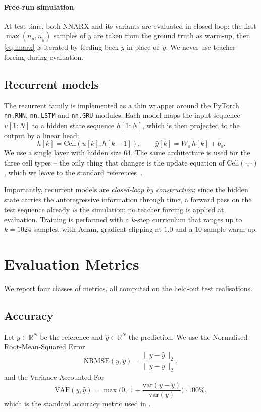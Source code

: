 \documentclass[conference]{IEEEtran}
\begin{document}
\paragraph{Free-run simulation}
At test time, both NNARX and its variants are evaluated in closed loop:
the first $\max(n_u,n_y)$ samples of $y$ are taken from the ground
truth as warm-up, then \eqref{eq:nnarx} is iterated by feeding back
$\hat{y}$ in place of~$y$. We never use teacher forcing during
evaluation.

\subsection{Recurrent models}
The recurrent family is implemented as a thin wrapper around the
PyTorch \texttt{nn.RNN}, \texttt{nn.LSTM} and \texttt{nn.GRU} modules.
Each model maps the input sequence $u[1{:}N]$ to a hidden state sequence
$h[1{:}N]$, which is then projected to the output by a linear head:
\begin{equation}
    h[k] = \mathrm{Cell}(u[k], h[k-1]), \qquad \hat{y}[k] = W_o\, h[k] + b_o.
\end{equation}
We use a single layer with hidden size $64$. The same architecture is
used for the three cell types -- the only thing that changes is the
update equation of $\mathrm{Cell}(\cdot,\cdot)$, which we leave to the
standard references~\cite{Elman1990,Hochreiter1997,Cho2014}.

Importantly, recurrent models are \emph{closed-loop by construction}:
since the hidden state carries the autoregressive information through
time, a forward pass on the test sequence already \emph{is} the
simulation; no teacher forcing is applied at evaluation. Training is
performed with a $k$-step curriculum that ranges up to $k=1024$ samples,
with Adam, gradient clipping at $1.0$ and a $10$-sample warm-up.

\section{Evaluation Metrics}\label{sec:metrics}

We report four classes of metrics, all computed on the held-out test
realisations.

\subsection{Accuracy}
Let $y\in\mathbb{R}^N$ be the reference and $\hat{y}\in\mathbb{R}^N$ the
prediction. We use the Normalised Root-Mean-Squared Error
\begin{equation}
    \mathrm{NRMSE}(y,\hat{y})
    = \frac{\|y-\hat{y}\|_2}{\|y-\bar y\|_2},
\end{equation}
and the Variance Accounted For
\begin{equation}
    \mathrm{VAF}(y,\hat{y})
    = \max\!\Big(0,\;
            1-\frac{\mathrm{var}(y-\hat{y})}{\mathrm{var}(y)}\Big)\cdot 100\%,
\end{equation}
which is the standard accuracy metric used in
\cite{Vlaar2018,Gu2018,Gu2021}.
\end{document}
